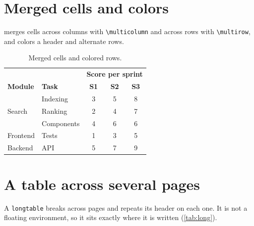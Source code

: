 \section{Merged cells and colors}

 merges cells across columns with \verb|\multicolumn| and
across rows with \verb|\multirow|, and colors a header and alternate rows.

\begin{table}[H]
  \centering
  \begin{tabular}{l l c c c}
    \toprule
    \rowcolor{blue!15}
    & & \multicolumn{3}{c}{\textbf{Score per sprint}} \\
    \rowcolor{blue!15}
    \textbf{Module} & \textbf{Task} & \textbf{S1} & \textbf{S2} & \textbf{S3} \\
    \midrule
                               & Indexing   & 3 & 5 & 8 \\
    \multirow{-2}{*}{Search}   & Ranking    & 2 & 4 & 7 \\
                               & Components & 4 & 6 & 6 \\
    \multirow{-2}{*}{Frontend} & Tests      & 1 & 3 & 5 \\
    Backend                   & API        & 5 & 7 & 9 \\
    \bottomrule
  \end{tabular}
  \caption{Merged cells and colored rows.}
  \label{tab:merged}
\end{table}

\section{A table across several pages}

A \texttt{longtable} breaks across pages and repeats its header on each one.
It is not a floating environment, so it sits exactly where it is written
(\cref{tab:long}).

